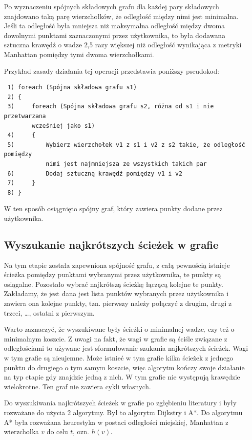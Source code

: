 \documentclass[a4paper,11pt,twoside]{report}
\theoremstyle{definition}
\begin{document}
Po wyznaczeniu spójnych składowych grafu dla każdej pary składowych znajdowano taką parę wierzchołków, że odległość między nimi jest minimalna. Jeśli ta odległość była mniejsza niż maksymalna odległość między dwoma dowolnymi punktami zaznaczonymi przez użytkownika, to była dodawana sztuczna krawędź o wadze 2,5 razy większej niż odległość wynikająca z metryki Manhattan pomiędzy tymi dwoma wierzchołkami. 

Przykład zasady działania tej operacji przedstawia poniższy pseudokod:

\begin{verbatim}
 1) foreach (Spójna składowa grafu s1)
 2) {
 3)     foreach (Spójna składowa grafu s2, różna od s1 i nie przetwarzana 
        wcześniej jako s1)
 4)     {
 5)         Wybierz wierzchołek v1 z s1 i v2 z s2 takie, że odległość pomiędzy 
            nimi jest najmniejsza ze wszystkich takich par
 6)         Dodaj sztuczną krawędź pomiędzy v1 i v2
 7)     }
 8) }
\end{verbatim}


W ten sposób osiągnięto spójny graf, który zawiera punkty dodane przez użytkownika. 

\subsection {Wyszukanie najkrótszych ścieżek w grafie}

Na tym etapie została zapewniona spójność grafu, z całą pewnością istnieje ścieżka pomiędzy punktami wybranymi przez użytkownika, te punkty są osiągalne. Pozostało wybrać najkrótszą ścieżkę łączącą kolejne te punkty. Zakładamy, że jest dana jest lista punktów wybranych przez użytkownika i zawiera ona kolejne punkty, tzn. pierwszy należy połączyć z drugim, drugi z trzeci, \dots, ostatni z pierwszym. 

Warto zaznaczyć, że wyszukiwane były ścieżki o minimalnej wadze, czy też o minimalnym koszcie. Z uwagi na fakt, że wagi w grafie są ściśle związane z odległościami to używane jest sformułowanie szukania najkrótszych ścieżek. Wagi w tym grafie są nieujemne. Może istnieć w tym grafie kilka ścieżek z jednego punktu do drugiego o tym samym koszcie, więc algorytm kończy swoje działanie na typ etapie gdy znajdzie jedną z nich. W tym grafie nie występują krawędzie wielokrotne. Ten graf nie zawiera cykli własnych.

Do wyszukiwania najkrótszych ścieżek w grafie po zgłębieniu literatury \cite{Algorytmy Sedgewick} i \cite{AiSD2} były rozważane do użycia 2 algorytmy. Był to algorytm Dijkstry i A*. Do algorytmu A* była rozważana heurestyka w postaci odległości miejskiej, Manhattan z wierzchołka $v$ do celu $t$, ozn. $h(v)$.
\end{document}
